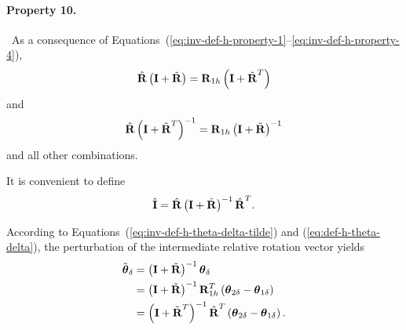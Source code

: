 \documentclass[10pt,dvips,fleqn,subeqn]{report}
\newcommand{\T}[1]{\bm{\mathbf{#1}}}
\begin{document}
\paragraph{Property 10.} \
As a consequence
of Equations~(\ref{eq:inv-def-h-property-1}--\ref{eq:inv-def-h-property-4}),
\begin{equation}
	\hat{\T{R}} \plbr{\T{I} + \tilde{\T{R}}} 
	= \T{R}_{1h} \plbr{\T{I} + \tilde{\T{R}}^T}
\end{equation}
and
\begin{equation}
	\hat{\T{R}} \plbr{\T{I} + \tilde{\T{R}}^T}^{-1}
	= \T{R}_{1h} \plbr{\T{I} + \tilde{\T{R}}}^{-1}
\end{equation}
and all other combinations.

\bigskip

It is convenient to define
\begin{equation}
	\hat{\T{I}} =
		\hat{\T{R}} \plbr{\T{I} + \tilde{\T{R}}}^{-1} \hat{\T{R}}^T .
\end{equation}

According to Equations~(\ref{eq:inv-def-h-theta-delta-tilde})
and (\ref{eq:def-h-theta-delta}),
the perturbation of the intermediate relative rotation vector yields
\begin{align}
	\tilde{\T{\theta}}_{\delta}
	&= \plbr{\T{I} + \tilde{\T{R}}}^{-1} \T{\theta}_{\delta} \nonumber \\
	&= \plbr{\T{I} + \tilde{\T{R}}}^{-1}
		\T{R}_{1h}^T\plbr{\T{\theta}_{2\delta} - \T{\theta}_{1\delta}} \nonumber \\
	&= \plbr{\T{I} + \tilde{\T{R}}^T}^{-1}
		\hat{\T{R}}^T\plbr{\T{\theta}_{2\delta} - \T{\theta}_{1\delta}} .
\end{align}
\end{document}
